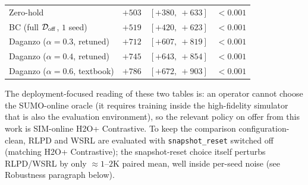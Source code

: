 \begin{table}[t]
{\begin{tabular}{lrrr}
Zero-hold                                            & $+503$ & $[+380,\ +633]$ & $<0.001$ \\
BC (full $\mathcal{D}_{\mathrm{off}}$, $1$ seed)                           & $+519$ & $[+420,\ +623]$ & $<0.001$ \\
Daganzo ($\alpha = 0.3$, retuned)                    & $+712$ & $[+607,\ +819]$ & $<0.001$ \\
Daganzo ($\alpha = 0.4$, retuned)                    & $+745$ & $[+643,\ +854]$ & $<0.001$ \\
Daganzo ($\alpha = 0.6$, textbook)                   & $+786$ & $[+672,\ +903]$ & $<0.001$ \\
\bottomrule
\end{tabular}%
}
\end{table}

The deployment-focused reading of these two tables is: an operator cannot choose the SUMO-online oracle (it requires training inside the high-fidelity simulator that is also the evaluation environment), so the relevant policy on offer from this work is SIM-online H2O+ Contrastive. To keep the comparison configuration-clean, RLPD and WSRL are evaluated with \texttt{snapshot\_reset} switched off (matching H2O+ Contrastive); the snapshot-reset choice itself perturbs RLPD/WSRL by only $\approx 1$--$2$K paired mean, well inside per-seed noise (see Robustness paragraph below).

